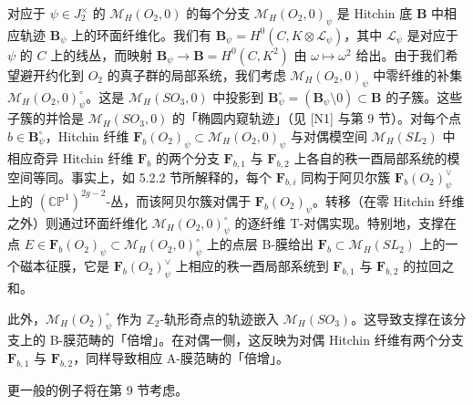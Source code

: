 对应于 $\psi\in J_2^\times$ 的 $\mathcal{M}_H(O_2,0)$ 的每个分支 $\mathcal{M}_H(O_2,0)_\psi$ 是 Hitchin 底 $\boldsymbol{B}$ 中相应轨迹 $\boldsymbol{B}_\psi$ 上的环面纤维化。我们有 $\boldsymbol{B}_\psi = H^0(C,K\otimes\mathcal{L}_\psi)$，其中 $\mathcal{L}_\psi$ 是对应于 $\psi$ 的 $C$ 上的线丛，而映射 $\boldsymbol{B}_\psi\to\boldsymbol{B} = H^0(C,K^2)$ 由 $\omega\mapsto\omega^2$ 给出。由于我们希望避开约化到 $O_2$ 的真子群的局部系统，我们考虑 $\mathcal{M}_H(O_2,0)_\psi$ 中零纤维的补集 $\mathcal{M}_H(O_2,0)_\psi^\circ$。这是 $\mathcal{M}_H(SO_3,0)$ 中投影到 $\boldsymbol{B}_\psi^\circ = (\boldsymbol{B}_\psi\setminus 0)\subset\boldsymbol{B}$ 的子簇。这些子簇的并恰是 $\mathcal{M}_H(SO_3,0)$ 的「椭圆内窥轨迹」（见 [N1] 与第 9 节）。对每个点 $b\in\boldsymbol{B}_\psi^\circ$，Hitchin 纤维 $\boldsymbol{F}_b(O_2)_\psi\subset\mathcal{M}_H(O_2,0)_\psi$ 与对偶模空间 $\mathcal{M}_H(SL_2)$ 中相应奇异 Hitchin 纤维 $\boldsymbol{F}_b$ 的两个分支 $\boldsymbol{F}_{b,1}$ 与 $\boldsymbol{F}_{b,2}$ 上各自的秩一酉局部系统的模空间等同。事实上，如 5.2.2 节所解释的，每个 $\boldsymbol{F}_{b,i}$ 同构于阿贝尔簇 $\boldsymbol{F}_b(O_2)_\psi^\vee$ 上的 $(\mathbb{CP}^1)^{2g-2}$-丛，而该阿贝尔簇对偶于 $\boldsymbol{F}_b(O_2)_\psi$。转移（在零 Hitchin 纤维之外）则通过环面纤维化 $\mathcal{M}_H(O_2,0)_\psi^\circ$ 的逐纤维 T-对偶实现。特别地，支撑在点 $E\in\boldsymbol{F}_b(O_2)_\psi\subset\mathcal{M}_H(O_2,0)_\psi^\circ$ 上的点层 B-膜给出 $\boldsymbol{F}_b\subset\mathcal{M}_H(SL_2)$ 上的一个磁本征膜，它是 $\boldsymbol{F}_b(O_2)_\psi^\vee$ 上相应的秩一酉局部系统到 $\boldsymbol{F}_{b,1}$ 与 $\boldsymbol{F}_{b,2}$ 的拉回之和。



此外，$\mathcal{M}_H(O_2)_\psi^\circ$ 作为 $\mathbb{Z}_2$-轨形奇点的轨迹嵌入 $\mathcal{M}_H(SO_3)$。这导致支撑在该分支上的 B-膜范畴的「倍增」。在对偶一侧，这反映为对偶 Hitchin 纤维有两个分支 $\boldsymbol{F}_{b,1}$ 与 $\boldsymbol{F}_{b,2}$，同样导致相应 A-膜范畴的「倍增」。

更一般的例子将在第 9 节考虑。
